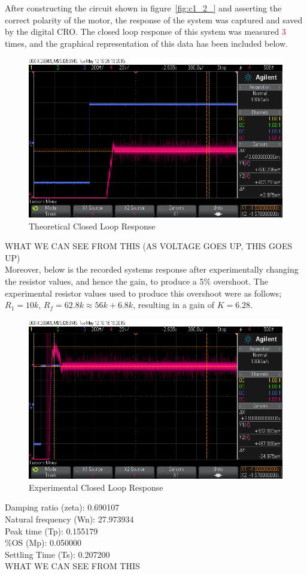 \documentclass[11pt,a4paper]{article}
\begin{document}
After constructing the circuit shown in figure~\ref{fig:c1_2_} and asserting the correct polarity of the motor, the response of the system was captured and saved by the digital CRO. The closed loop response of this system was measured \textcolor{red}{3} times, and the graphical representation of this data has been included below.\\
	\begin{figure}[H]
		\centering
			\includegraphics[width=0.5\linewidth]{Oscilloscope/PartC_Theoretical_Overshoot.png} 
			\caption{Theoretical Closed Loop Response}
			\label{fig:subim1}
	\end{figure}


WHAT WE CAN SEE FROM THIS (AS VOLTAGE GOES UP, THIS GOES UP) \\
Moreover, below is the recorded systems response after experimentally changing the resistor values, and hence the gain, to produce a 5\% overshoot. The experimental resistor values used to produce this overshoot were as follows; $R_1 = 10k$, $R_f = 62.8k \approx 56k + 6.8k$, resulting in a gain of $K = 6.28$. 

	\begin{figure}[H]
		\centering
		\includegraphics[width=0.5\linewidth]{Oscilloscope/PartC_Experimental_Overshoot.png}
		\caption{Experimental Closed Loop Response}
		\label{fig:subim2}
	\end{figure}

Damping ratio (zeta): 0.690107\\
Natural frequency (Wn): 27.973934\\
Peak time (Tp): 0.155179\\
\%OS (Mp): 0.050000\\
Settling Time (Ts): 0.207200\\
WHAT WE CAN SEE FROM THIS\\
\end{document}
